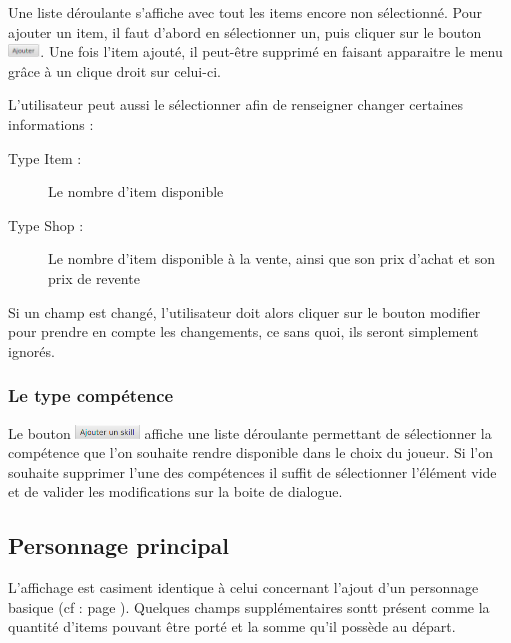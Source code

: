 				Une liste déroulante s'affiche avec tout les items encore non sélectionné. Pour ajouter un item, il faut d'abord en sélectionner un, puis cliquer sur le bouton \includegraphics[height=10pt, keepaspectratio]{img/ajouterBouton.png}. Une fois l'item ajouté, il peut-être supprimé en faisant apparaitre le menu grâce à un clique droit sur celui-ci.

				L'utilisateur peut aussi le sélectionner afin de renseigner changer certaines informations :

				\begin{description}
					\item[Type Item :] Le nombre d'item disponible
					\item[Type Shop :] Le nombre d'item disponible à la vente, ainsi que son prix d'achat et son prix de revente
				\end{description}

				Si un champ est changé, l'utilisateur doit alors cliquer sur le bouton modifier pour prendre en compte les changements, ce sans quoi, ils seront simplement ignorés.

			\subsubsection{Le type compétence}
				 \label{subsubsec:persoCreationSkill}

				Le bouton \includegraphics[height=10pt, keepaspectratio]{img/preludeAjouterSkillBouton.png} affiche une liste déroulante permettant de sélectionner la compétence que l'on souhaite rendre disponible dans le choix du joueur. Si l'on souhaite supprimer l'une des compétences il suffit de sélectionner l'élément vide et de valider les modifications sur la boite de dialogue.

		\subsection{Personnage principal}
			\label{subsec:main_character}

			L'affichage est casiment identique à celui concernant l'ajout d'un personnage basique (cf :  page \pageref{sec:perso}). Quelques champs supplémentaires sontt présent comme la quantité d'items pouvant être porté et la somme qu'il possède au départ.

